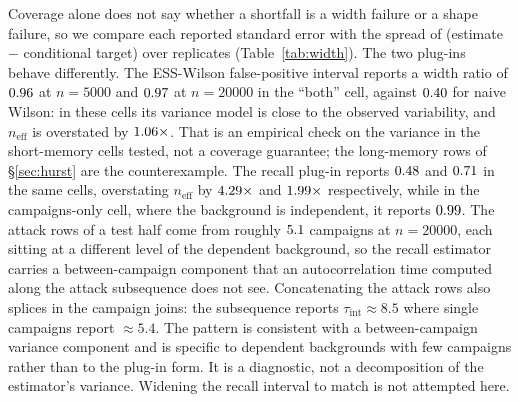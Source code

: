 \documentclass[a4paper,fleqn]{cas-dc}
\newcommand{\neff}{n_{\mathrm{eff}}}
\newcommand{\tabwidth}{\columnwidth}
\newcommand{\tabbody}{\small\setlength{\tabcolsep}{3.5pt}\renewcommand{\arraystretch}{1.08}}
\newcommand{\fulltab}{\renewcommand{\tabwidth}{\textwidth}\tabbody}
\begin{document}
Coverage alone does not say whether a shortfall is a width failure or a shape failure, so we
compare each reported standard error with the spread of (estimate $-$ conditional target) over
replicates (Table~\ref{tab:width}). The two plug-ins behave differently. The ESS-Wilson
false-positive interval reports a width ratio of $0.96$ at $n{=}5000$ and
$0.97$ at $n{=}20000$ in the ``both'' cell, against $0.40$ for naive Wilson: in
these cells its variance model is close to the observed variability, and $\neff$ is overstated by
$1.06\times$. That is an empirical check on the variance in the short-memory cells
tested, not a coverage guarantee; the long-memory rows of \S\ref{sec:hurst} are the counterexample. The recall plug-in reports $0.48$ and $0.71$ in the
same cells, overstating $\neff$ by $4.29\times$ and
$1.99\times$ respectively, while in the campaigns-only cell, where the background
is independent, it reports $0.99$. The attack rows of a test half come from roughly
$5.1$ campaigns at $n{=}20000$, each sitting at a different level of the dependent
background, so the recall estimator carries a between-campaign component that an autocorrelation
time computed along the attack subsequence does not see. Concatenating the attack rows also splices
in the campaign joins: the subsequence reports $\tau_{\mathrm{int}}\approx8.5$ where single
campaigns report $\approx5.4$. The pattern is consistent with a between-campaign variance component
and is specific to dependent backgrounds with few campaigns rather than to the plug-in form. It is
a diagnostic, not a decomposition of the estimator's variance. Widening the recall interval to
match is not attempted here.
\begin{table}[!t]
\centering
\caption{Reported standard error against the spread of (estimate $-$ conditional target),
$R{=}400$ per cell. A ratio below one is an interval narrower than the estimator's variability.
From \texttt{diagnostics/}\allowbreak\texttt{width.csv}.}\label{tab:width}
\fulltab

\end{table}
\end{document}
